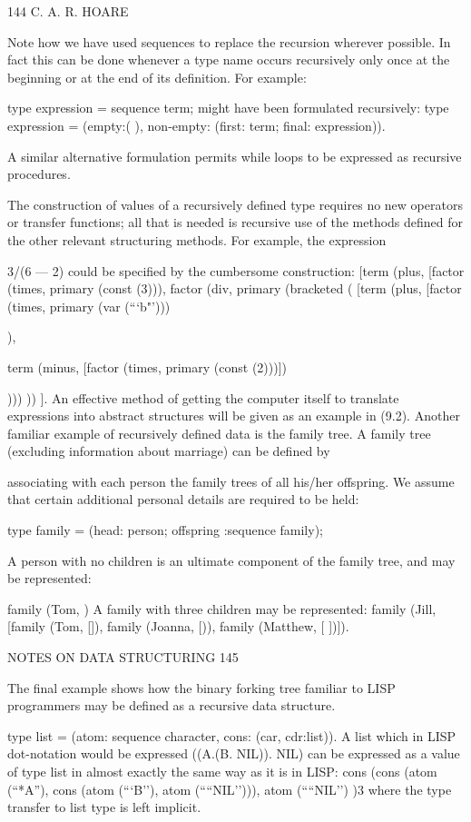 {{{{				144 C. A. R. HOARE
				
				Note how we have used sequences to replace the recursion wherever possible. In fact this can be done whenever a type name occurs recursively only once at the beginning or at the end of its definition. For example:
				
				type expression = sequence term; might have been formulated recursively: type expression = (empty:( ), non-empty: (first: term; final: expression)).
				
				A similar alternative formulation permits while loops to be expressed as recursive procedures.
				
				The construction of values of a recursively defined type requires no new operators or transfer functions; all that is needed is recursive use of the methods defined for the other relevant structuring methods. For example, the expression
				
				3/(6 — 2) could be specified by the cumbersome construction: [term (plus, [factor (times, primary (const (3))), factor (div, primary (bracketed ( [term (plus, [factor (times, primary (var (“‘b"’)))}),
			
			term (minus, [factor (times, primary (const (2)))])}))) )) ]. An effective method of getting the computer itself to translate expressions into abstract structures will be given as an example in (9.2). Another familiar example of recursively defined data is the family tree. A family tree (excluding information about marriage) can be defined by
		
		associating with each person the family trees of all his/her offspring. We assume that certain additional personal details are required to be held:
		
		type family = (head: person; offspring :sequence family);
		
		A person with no children is an ultimate component of the family tree, and may be represented:
		
		family (Tom, { }) A family with three children may be represented: family (Jill, [family (Tom, []), family (Joanna, [)), family (Matthew, [ ])]).
		
		NOTES ON DATA STRUCTURING 145
		
		The final example shows how the binary forking tree familiar to LISP programmers may be defined as a recursive data structure.
		
		type list = (atom: sequence character, cons: (car, cdr:list)). A list which in LISP dot-notation would be expressed ((A.(B. NIL)). NIL) can be expressed as a value of type list in almost exactly the same way as it is in LISP: cons (cons (atom (“*A”), cons (atom (“‘B’’), atom (““NIL’’))), atom (““NIL’’) )3 where the type transfer to list type is left implicit.
		
}}
